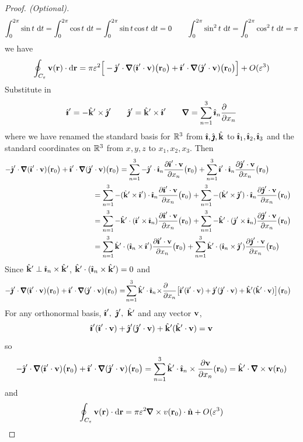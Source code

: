 \begin{proof}[Proof. (Optional)]
{\begin{equation*}
\int_0^{2\pi}\sin t\ \dee{t}=\int_0^{2\pi}\cos t\ \dee{t}
=\int_0^{2\pi}\sin t\cos t\ \dee{t}=0\qquad
\int_0^{2\pi}\sin^2 t\ \dee{t}=\int_0^{2\pi}\cos^2 t\ \dee{t}=\pi
\end{equation*}
we have
\begin{equation*}
\oint_{C_\veps} \vv(\vr)\cdot \dee{\vr}
=\pi\veps^2\Big[-\hj'\cdot\vnabla(\hi'\cdot\vv)\big(\vr_0\big)
    +\hi'\cdot\vnabla(\hj'\cdot\vv)\big(\vr_0\big)\Big]+O(\veps^3)
\end{equation*}
Substitute in 
\begin{equation*}
\hi'=-\hk'\times \hj'\qquad
\hj'=\hk'\times \hi'\qquad
\vnabla=\sum_{n=1}^3\hi_n\frac{\partial\hfill}{\partial x_n}
\end{equation*}
where we have renamed the standard basis for $\mathbb{R}^3$ from $\hat{\pmb{\imath}},\hat{\pmb{\jmath}},\hat{\mathbf{k}}$
to $\hat{\pmb{\imath}}_1,\hat{\pmb{\imath}}_2,\hat{\pmb{\imath}}_3$ and the standard coordinates on $\mathbb{R}^3$ from $x,y,z$
to $x_1,x_2,x_3$. Then
\begin{align*}
-\hj'\cdot\vnabla(\hi'\cdot\vv)\big(\vr_0\big)+\hi'\cdot\vnabla(\hj'\cdot\vv)\big(\vr_0\big)
&=\sum_{n=1}^3 -\hj'\cdot\hi_n\frac{\partial \hi'\cdot\vv}
{\partial x_n}\big(\vr_0\big)
+\sum_{n=1}^3\hi'\cdot\hi_n\frac{\partial \hj'\cdot\vv}{\partial x_n}\big(\vr_0\big)\cr
&\hskip-.5in=\sum_{n=1}^3 -(\hk'\times \hi')\cdot\hi_n\frac{\partial \hi'\cdot\vv}
{\partial x_n}\big(\vr_0\big)
+\sum_{n=1}^3-(\hk'\times \hj')\cdot\hi_n\frac{\partial \hj'\cdot\vv}{\partial x_n}\big(\vr_0\big)\cr
&\hskip-.5in=\sum_{n=1}^3 -\hk'\cdot( \hi'\times\hi_n)\frac{\partial \hi'\cdot\vv}
{\partial x_n}\big(\vr_0\big)
+\sum_{n=1}^3-\hk'\cdot( \hj'\times\hi_n)\frac{\partial \hj'\cdot\vv}{\partial x_n}\big(\vr_0\big)\cr
&\hskip-.5in=\sum_{n=1}^3 \hk'\cdot( \hi_n\times\hi')\frac{\partial \hi'\cdot\vv}
{\partial x_n}\big(\vr_0\big)
+\sum_{n=1}^3\hk'\cdot( \hi_n\times\hj')\frac{\partial \hj'\cdot\vv}{\partial x_n}\big(\vr_0\big)\cr
\end{align*}
Since $\hat{\mathbf{k}}'\perp \hat{\pmb{\imath}}_n\times\hat{\mathbf{k}}'$,  $\hat{\mathbf{k}}'\cdot( \hat{\pmb{\imath}}_n\times\hat{\mathbf{k}}')=0$
and
\begin{align*}
-\hj'\cdot\vnabla(\hi'\cdot\vv)\big(\vr_0\big)+\hi'\cdot\vnabla(\hj'\cdot\vv)
         \big(\vr_0\big)
&=\!\sum_{n=1}^3 \hk'\cdot \hi_n\!\times\!
\frac{\partial \hfill}{\partial x_n}
\big[\hi'(\hi'\cdot\vv)
+\hj'(\hj'\cdot\vv)
+\hk'(\hk'\cdot\vv)\big]\big(\vr_0\big)
\end{align*}
For any orthonormal basis, $\hat{\pmb{\imath}}',\ \hat{\pmb{\jmath}}',\ \hat{\mathbf{k}}'$ and any vector $\mathbf{v}$,
\begin{equation*}
\hat{\pmb{\imath}}'(\hat{\pmb{\imath}}'\cdot\mathbf{v})
+\hat{\pmb{\jmath}}'(\hat{\pmb{\jmath}}'\cdot\mathbf{v})
+\hat{\mathbf{k}}'(\hat{\mathbf{k}}'\cdot\mathbf{v})=\mathbf{v}
\end{equation*}
so
\begin{equation*}
-\hj'\cdot\vnabla(\hi'\cdot\vv)\big(\vr_0\big)+\hi'\cdot\vnabla(\hj'\cdot\vv)\big(\vr_0\big)
=\sum_{n=1}^3 \hk'\cdot \hi_n\times
\frac{\partial \vv}{\partial x_n}(\vr_0)
=\hk'\cdot\vnabla\times \vv(\vr_0)
\end{equation*}
and
\begin{equation*}
\oint_{C_\veps} \vv(\vr)\cdot \dee{\vr} =\pi\veps^2\vnabla\times v(\vr_0)\cdot \hn
+O(\veps^3)
\end{equation*}
}

\end{proof}

